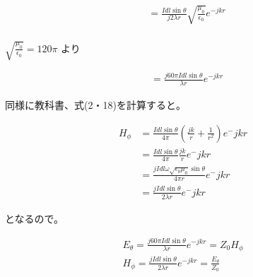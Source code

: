 \documentclass[dvipdfmx,autodetect-engine,titlepage]{jsarticle}
\begin{document}
\begin{align*}
  &= \frac{Idl\sin \theta }{j2\lambda r}\sqrt{\frac{\mu _0}{\epsilon _0} } e^{-jkr}\\
\end{align*}

\begin{math}
  \sqrt{\frac{\mu _0}{\epsilon _0} } = 120\pi
\end{math}
より

\begin{align*}
  &= \frac{j60\pi Idl\sin \theta }{\lambda r}e^{-jkr} \tag{(2・22)真ん中}
\end{align*}

同様に教科書、式(2・18)を計算すると。

\begin{align*}
  H_\phi &= \frac{Idl\sin \theta }{4\pi }(\frac{jk}{r}+\frac{1}{r^2})e^-jkr\\
  &= \frac{Idl\sin \theta }{4\pi }\frac{jk}{r}e^-jkr\\
  &= \frac{jIdl\omega \sqrt{\epsilon _{0}\mu _0}\sin \theta}{4\pi r}e^-jkr\\
  &= \frac{jIdl\sin \theta}{2\lambda r}e^-jkr
\end{align*}

となるので。

\begin{align*}
  E_{\theta } = \frac{j60\pi Idl\sin \theta }{\lambda r}e^{-jkr} = Z_{0}H_\phi \tag{2・22}\\
  H_\phi = \frac{jIdl\sin \theta}{2\lambda r}e^{-jkr} = \frac{E_\theta }{Z_0} \tag{2・23}
\end{align*}
\end{document}
